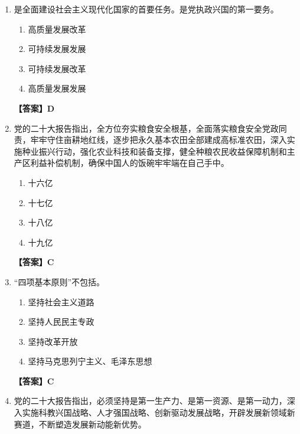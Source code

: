 \documentclass[UTF8,11pt,a4paper]{ctexart}
\begin{document}
\begin{enumerate}[label=\textbf{\arabic*.}, leftmargin=2.5em, itemsep=0.7em]
\begin{enumerate}[label=\Alph*., leftmargin=2em, itemsep=0.1em, topsep=0.15em]
\end{enumerate}
\textbf{【答案】A}
\item \allowbreak\underline{\hspace{4em}}是全面建设社会主义现代化国家的首要任务。\allowbreak\underline{\hspace{4em}}是党执政兴国的第一要务。
\begin{enumerate}[label=\Alph*., leftmargin=2em, itemsep=0.1em, topsep=0.15em]
\item 高质量发展改革
\item 可持续发展发展
\item 可持续发展改革
\item 高质量发展发展
\end{enumerate}
\textbf{【答案】D}
\item 党的二十大报告指出，全方位夯实粮食安全根基，全面落实粮食安全党政同责，牢牢守住\allowbreak\underline{\hspace{4em}}亩耕地红线，逐步把永久基本农田全部建成高标准农田，深入实施种业振兴行动，强化农业科技和装备支撑，健全种粮农民收益保障机制和主产区利益补偿机制，确保中国人的饭碗牢牢端在自己手中。
\begin{enumerate}[label=\Alph*., leftmargin=2em, itemsep=0.1em, topsep=0.15em]
\item 十六亿
\item 十七亿
\item 十八亿
\item 十九亿
\end{enumerate}
\textbf{【答案】C}
\item “四项基本原则”不包括\allowbreak\underline{\hspace{4em}}。
\begin{enumerate}[label=\Alph*., leftmargin=2em, itemsep=0.1em, topsep=0.15em]
\item 坚持社会主义道路
\item 坚持人民民主专政
\item 坚持改革开放
\item 坚持马克思列宁主义、毛泽东思想
\end{enumerate}
\textbf{【答案】C}
\item 党的二十大报告指出，必须坚持\allowbreak\underline{\hspace{4em}}是第一生产力、\allowbreak\underline{\hspace{4em}}是第一资源、\allowbreak\underline{\hspace{4em}}是第一动力，深入实施科教兴国战略、人才强国战略、创新驱动发展战略，开辟发展新领域新赛道，不断塑造发展新动能新优势。
\begin{enumerate}[label=\Alph*., leftmargin=2em, itemsep=0.1em, topsep=0.15em]

\end{enumerate}
\end{enumerate}
\end{document}
